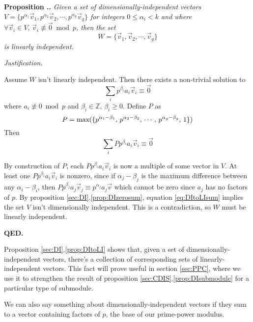 \documentclass[a4paper, 12pt, reqno]{amsart}
\newcommand\mathmax[1]{\textup{max}(#1)}
\newcounter{propcounter}[section]
\newenvironment{proposition}[1]
{
	\refstepcounter{propcounter}
	\textbf{Proposition \thesection.\thepropcounter.} \emph{#1}
	
	\emph{Justification.}
}
{
	\textbf{QED.} \\
}
\begin{document}
		\begin{proposition}{Given a set of dimensionally-independent vectors \\ 
		$V = \{p^{\alpha_1}\vec{v}_1, p^{\alpha_2}\vec{v}_2, \cdots, p^{\alpha_g}\vec{v}_g\}$ for integers $0 \leq \alpha_i < k$ and where \\
		$\forall \vec{v}_i \in V,\, \vec{v}_i \not\equiv \vec{0} \bmod{p}$, then the set 
		\[
			W = \{\vec{v}_1, \vec{v}_2, \cdots, \vec{v}_g\}
		\]
		is linearly independent.}
			\label{prop:DItoLI}
			Assume $W$ isn't linearly independent. Then there exists a non-trivial solution to
			\[
				\sum_i p^{\beta_i}a_i\vec{v}_i \equiv \vec{0}
			\]
			where $a_i \not\equiv 0 \bmod{p}$ and $\beta_i \in \mathds{Z},\, \beta_i \geq 0$. Define $P$ as
			\[
				P = \mathmax{\{p^{\alpha_1-\beta_1},\, p^{\alpha_2-\beta_2},\, \cdots,\, p^{\alpha_g-\beta_g},\, 1\}}
			\]
			Then
			\begin{equation}
				\label{eq:DItoLIsum}
				\sum_i Pp^{\beta_i}a_i\vec{v}_i \equiv \vec{0}
			\end{equation}
			
			By construction of $P$, each $Pp^{\beta_i}a_i\vec{v}_i$ is now a multiple of some vector in $V$. At least one $Pp^{\beta_i}a_i\vec{v}_i$ is nonzero, since 
			if $\alpha_j-\beta_j$ is the maximum difference between any $\alpha_i-\beta_i$, then $Pp^{\beta_j}a_j\vec{v}_j \equiv p^{\alpha_j}a_j\vec{v}$ which cannot be 
			zero since $a_j$ has no factors of $p$. By proposition \ref{sec:DI}.\ref{prop:DIzerosum}, equation \ref{eq:DItoLIsum} implies the set $V$ isn't dimensionally 
			independent. This is a contradiction, so $W$ must be linearly independent.
		\end{proposition}
		
		Proposition \ref{sec:DI}.\ref{prop:DItoLI} shows that, given a set of dimensionally-independent vectors, there's a collection of corresponding sets of 
		linearly-independent vectors. This fact will prove useful in section \ref{sec:PPC}, where we use it to strengthen the result of proposition 
		\ref{sec:CDIS}.\ref{prop:DIsubmodule} for a particular type of submodule.
		
		We can also say something about dimensionally-independent vectors if they sum to a vector containing factors of $p$, the base of our prime-power modulus.
		
\end{document}
